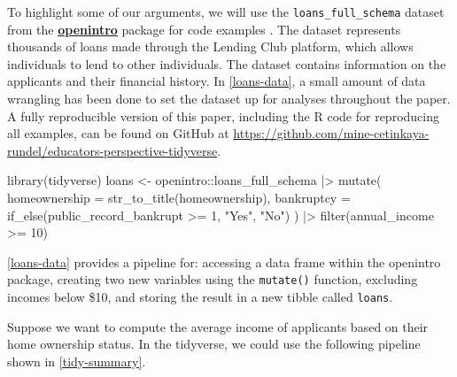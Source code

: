 \documentclass[12pt]{article}
\newenvironment{Shaded}{\begin{snugshade}}{\end{snugshade}}
\newcommand{\AttributeTok}[1]{\textcolor[rgb]{0.77,0.63,0.00}{#1}}
\newcommand{\DecValTok}[1]{\textcolor[rgb]{0.00,0.00,0.81}{#1}}
\newcommand{\FunctionTok}[1]{\textcolor[rgb]{0.00,0.00,0.00}{#1}}
\newcommand{\NormalTok}[1]{#1}
\newcommand{\OtherTok}[1]{\textcolor[rgb]{0.56,0.35,0.01}{#1}}
\newcommand{\SpecialCharTok}[1]{\textcolor[rgb]{0.00,0.00,0.00}{#1}}
\newcommand{\StringTok}[1]{\textcolor[rgb]{0.31,0.60,0.02}{#1}}
\newcommand{\github}[1]{\href{https://github.com/mine-cetinkaya-rundel/educators-perspective-tidyverse}{https://github.com/mine-cetinkaya-rundel/educators-perspective-tidyverse}}
\begin{document}
To highlight some of our arguments, we will use the
\texttt{loans\_full\_schema} dataset from the
\href{http://openintrostat.github.io/openintro/index.html}{\textbf{openintro}}
package for code examples \citep{R-openintro}. The dataset represents
thousands of loans made through the Lending Club platform, which allows
individuals to lend to other individuals. The dataset contains
information on the applicants and their financial history. In
\ref{loans-data}, a small amount of data wrangling has been done to set
the dataset up for analyses throughout the paper. A fully reproducible
version of this paper, including the R code for reproducing all
examples, can be found on GitHub at \github{}.

\linespread{1}

\begin{Shaded}
\begin{Highlighting}[]
\FunctionTok{library}\NormalTok{(tidyverse)}
\NormalTok{loans }\OtherTok{\textless{}{-}}\NormalTok{ openintro}\SpecialCharTok{::}\NormalTok{loans\_full\_schema }\SpecialCharTok{|\textgreater{}}
  \FunctionTok{mutate}\NormalTok{(}
    \AttributeTok{homeownership =} \FunctionTok{str\_to\_title}\NormalTok{(homeownership), }
    \AttributeTok{bankruptcy =} \FunctionTok{if\_else}\NormalTok{(public\_record\_bankrupt }\SpecialCharTok{\textgreater{}=} \DecValTok{1}\NormalTok{, }\StringTok{"Yes"}\NormalTok{, }\StringTok{"No"}\NormalTok{)}
\NormalTok{  ) }\SpecialCharTok{|\textgreater{}}
  \FunctionTok{filter}\NormalTok{(annual\_income }\SpecialCharTok{\textgreater{}=} \DecValTok{10}\NormalTok{)}
\end{Highlighting}
\end{Shaded}


\label{loans-data} \linespread{2}
\vspace{3mm}\setlength{\parindent}{15pt}

\ref{loans-data} provides a pipeline for: accessing a data frame within
the openintro package, creating two new variables using the
\texttt{mutate()} function, excluding incomes below \$10, and storing
the result in a new tibble called \texttt{loans}.

Suppose we want to compute the average income of applicants based on
their home ownership status. In the tidyverse, we could use the
following pipeline shown in \ref{tidy-summary}.

\linespread{1}
\end{document}

